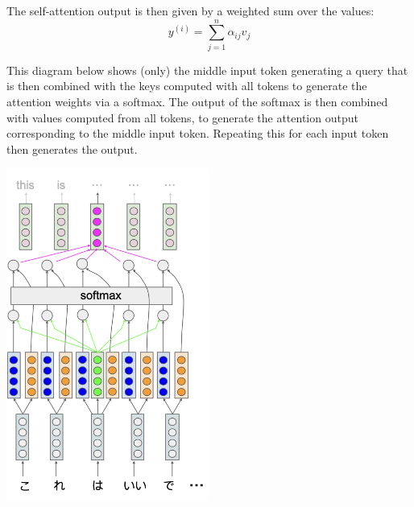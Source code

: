 The self-attention output is then given by a weighted sum over the values:
$${y}^{(i)} = \sum_{j=1}^n  \alpha_{ij}
  v_{j}$$

This diagram below shows (only) the middle input token generating a query that is then combined with the keys computed with all tokens to generate the attention weights via a softmax. The output of the softmax is then combined with values computed from all tokens, to generate the attention output corresponding to the middle input token. Repeating this for each input token then generates the output.


\begin{center}
  \includegraphics[width=2.615in]{figures/transformer-self-attention.png}
\end{center}




